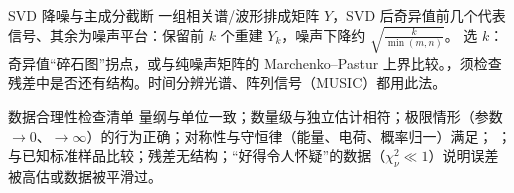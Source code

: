 \begin{结论}{SVD 降噪与主成分截断}
一组相关谱/波形排成矩阵 $Y$，SVD 后奇异值前几个代表信号、其余为噪声平台：保留前 $k$ 个重建 $Y_k$，噪声下降约 $\sqrt{\frac{k}{\min(m,n)}}$。
选 $k$：奇异值“碎石图”拐点，或与纯噪声矩阵的 Marchenko--Pastur 上界比较。，须检查残差中是否还有结构。时间分辨光谱、阵列信号（MUSIC）都用此法。
\end{结论}

\begin{结论}{数据合理性检查清单}
量纲与单位一致；数量级与独立估计相符；极限情形（参数 $\to0$、$\to\infty$）的行为正确；对称性与守恒律（能量、电荷、概率归一）满足；
；与已知标准样品比较；残差无结构；“好得令人怀疑”的数据（$\chi^2_\nu\ll1$）说明误差被高估或数据被平滑过。
\end{结论}

